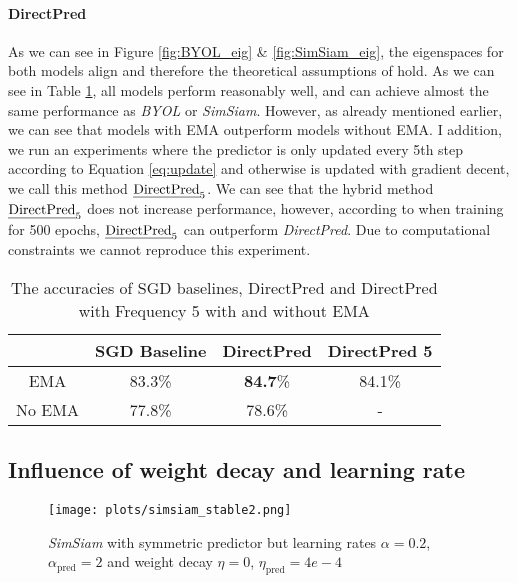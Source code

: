 \paragraph{DirectPred}
As we can see in Figure \ref{fig:BYOL_eig} \& \ref{fig:SimSiam_eig}, the eigenspaces for both 
models align and therefore the theoretical assumptions of \cite{tian2021understanding} hold. 
As we can see in Table \ref{tab:results}, all models perform reasonably well, and can achieve 
almost the same performance as \emph{BYOL} or \emph{SimSiam}. However, as already mentioned earlier, 
we can see that models with EMA outperform models without EMA. I addition, we run an experiments 
where the predictor is only updated every 5th step according to Equation \ref{eq:update} and 
otherwise is updated with gradient decent, we call this method $\text{\emph{DirectPred}}_5$.
 We can see that the hybrid method $\text{\emph{DirectPred}}_5$ does not increase performance, 
 however, according to \cite{tian2021understanding} when training for 500 epochs, 
 $\text{\emph{DirectPred}}_5$ can outperform \emph{DirectPred}. Due to computational constraints 
 we cannot reproduce this experiment. 

\begin{table}[h]
    \centering
    \begin{tabular}{c||c|c|c}
         &  SGD Baseline & DirectPred & DirectPred 5 \\
         \hline
         EMA & 83.3\% & \textbf{84.7}\% & 84.1\%\\
         \hline
         No EMA & 77.8\% & 78.6\% & - 
    \end{tabular}
    \caption{The accuracies of SGD baselines, DirectPred and DirectPred with Frequency 5 with and without EMA }
    \label{tab:results}
\end{table}

\subsection{Influence of weight decay and learning rate}
\label{sec:eta_and_lr}
\begin{figure}[h]
    \centering
    \texttt{[image: plots/simsiam\_stable2.png]}
    \caption{\emph{SimSiam} with symmetric predictor but learning rates $\alpha = 0.2$, $\alpha_{\text{pred}} = 2$ and weight decay $\eta = 0$, $\eta_{\text{pred}} = 4e-4$}
    \label{fig:simsiam_stable}
\end{figure}

